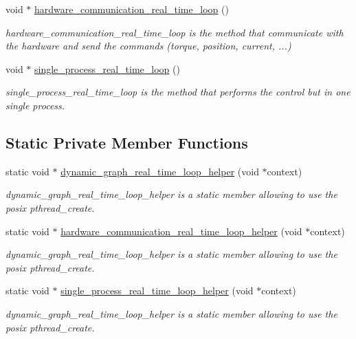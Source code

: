\begin{DoxyCompactItemize}
\mbox{\label{classdynamic__graph_1_1DynamicGraphManager_a4ea4183f1a4bd2d450ffb4a0a22b4242}} 
void $\ast$ \hyperlink{classdynamic__graph_1_1DynamicGraphManager_a4ea4183f1a4bd2d450ffb4a0a22b4242}{hardware\+\_\+communication\+\_\+real\+\_\+time\+\_\+loop} ()
\begin{DoxyCompactList}\small\item\em hardware\+\_\+communication\+\_\+real\+\_\+time\+\_\+loop is the method that communicate with the hardware and send the commands (torque, position, current, ...) \end{DoxyCompactList}\item 
void $\ast$ \hyperlink{classdynamic__graph_1_1DynamicGraphManager_adf3adb88c5913b21b51c1f7bfab6d0f3}{single\+\_\+process\+\_\+real\+\_\+time\+\_\+loop} ()
\begin{DoxyCompactList}\small\item\em single\+\_\+process\+\_\+real\+\_\+time\+\_\+loop is the method that performs the control but in one single process. \end{DoxyCompactList}\end{DoxyCompactItemize}
\subsection*{Static Private Member Functions}
\begin{DoxyCompactItemize}
\item 
static void $\ast$ \hyperlink{classdynamic__graph_1_1DynamicGraphManager_a7d289a916922f69796b0042f64de1499}{dynamic\+\_\+graph\+\_\+real\+\_\+time\+\_\+loop\+\_\+helper} (void $\ast$context)
\begin{DoxyCompactList}\small\item\em dynamic\+\_\+graph\+\_\+real\+\_\+time\+\_\+loop\+\_\+helper is a static member allowing to use the posix pthread\+\_\+create. \end{DoxyCompactList}\item 
static void $\ast$ \hyperlink{classdynamic__graph_1_1DynamicGraphManager_a771ad93758759932899273c5f01975fc}{hardware\+\_\+communication\+\_\+real\+\_\+time\+\_\+loop\+\_\+helper} (void $\ast$context)
\begin{DoxyCompactList}\small\item\em dynamic\+\_\+graph\+\_\+real\+\_\+time\+\_\+loop\+\_\+helper is a static member allowing to use the posix pthread\+\_\+create. \end{DoxyCompactList}\item 
static void $\ast$ \hyperlink{classdynamic__graph_1_1DynamicGraphManager_af28f8990655ae8464acb3bd4c56a74c2}{single\+\_\+process\+\_\+real\+\_\+time\+\_\+loop\+\_\+helper} (void $\ast$context)
\begin{DoxyCompactList}\small\item\em dynamic\+\_\+graph\+\_\+real\+\_\+time\+\_\+loop\+\_\+helper is a static member allowing to use the posix pthread\+\_\+create. \end{DoxyCompactList}\end{DoxyCompactItemize}


